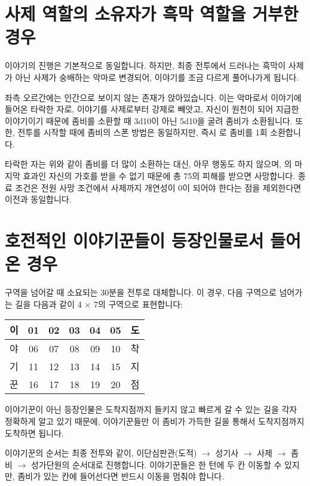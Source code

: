 \documentclass{report}
\begin{document}
	\hypertarget{alternative:no-criminal}{}
	\section{사제 역할의 소유자가 흑막 역할을 거부한 경우}
		이야기의 진행은 기본적으로 동일합니다. 하지만, 최종 전투에서 드러나는 흑막이 사제가 아닌 사제가 숭배하는 악마로 변경되어, 이야기를 조금 다르게 풀어나가게 됩니다.
		
		좌측 오르간에는 인간으로 보이지 않는 존재가 앉아있습니다. 이는 악마로서 이야기에 들어온 타락한 자로,  이야기를 사제로부터 강제로 빼앗고, 자신이 원천이 되어 지급한 이야기이기 때문에 좀비를 소환할 때 3d10이 아닌 5d10을 굴려 좀비가 소환됩니다. 또한, 전투를 시작할 때에 좀비의 스폰 방법은 동일하지만, 즉시 로 좀비를 1회 소환합니다.
		
		타락한 자는 위와 같이 좀비를 더 많이 소환하는 대신, 아무 행동도 하지 않으며, 의 마지막 효과인 자신의 가호를 받을 수 없기 때문에 총 75의 피해를 받으면 사망합니다. 종료 조건은 전원 사망 조건에서 사제까지 개연성이 0이 되어야 한다는 점을 제외한다면 이전과 동일합니다.
	
	\hypertarget{alternative:war-ready}{}
	\section{호전적인 이야기꾼들이 등장인물로서 들어온 경우}
		구역을 넘어갈 때 소요되는 30분을 전투로 대체합니다. 이 경우, 다음 구역으로 넘어가는 길을 다음과 같이 4 $\times$ 7의 구역으로 표현합니다:
		
		\begin{center}
			\begin{tabular}{|c|c|c|c|c|c|c|}
				\hline
				이 & 01 & 02 & 03 & 04 & 05 & 도 \\\hline
				야 & 06 & 07 & 08 & 09 & 10 & 착 \\\hline
				기 & 11 & 12 & 13 & 14 & 15 & 지 \\\hline
				꾼 & 16 & 17 & 18 & 19 & 20 & 점 \\\hline
			\end{tabular}
		\end{center}
		
		이야기꾼이 아닌 등장인물은 도착지점까지 들키지 않고 빠르게 갈 수 있는 길을 각자 정확하게 알고 있기 때문에, 이야기꾼들만 이 좀비가 가득한 길을 통해서 도착지점까지 도착하면 됩니다.
		
		이야기꾼의 순서는 최종 전투와 같이, 이단심판관(도적) $\rightarrow$ 성기사 $\rightarrow$ 사제 $\rightarrow$ 좀비 $\rightarrow$ 성가단원의 순서대로 진행합니다. 이야기꾼들은 한 턴에 두 칸 이동할 수 있지만, 좀비가 있는 칸에 들어선다면 반드시 이동을 멈춰야 합니다.
		
\end{document}
